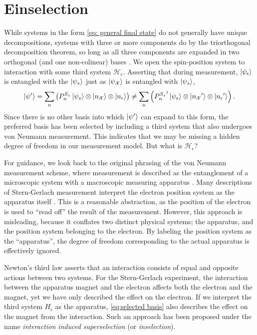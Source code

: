 \section{Einselection}

While systems in the form \autoref{eq: general final state} do not generally have unique decompositions, systems with three or more components do by the triorthogonal decomposition theorem, so long as all three components are expanded in two orthogonal (and one non-colinear) bases \cite{Elby}. We open the spin-position system to interaction with some third system $\mathcal{H}_\epsilon$. Asserting that during measurement, $\ket{\psi_\epsilon}$ is entangled with the $\ket{\psi_s}$ just as $\ket{\psi_\mathcal{X}}$ is entangled with $\ket{\psi_s}$,
\begin{align} \label{eq:selected basis}
  \ket{\psi'} = \sum_{n}\left(P^{S_z}_n\ket{\psi_s} \otimes \ket{n_\mathcal{X}} \otimes \ket{n_\epsilon} \right) \neq \sum_{n}\left({P^{S_z}_n}'\ket{\psi_s} \otimes \ket{{n_\mathcal{X}}'} \otimes \ket{{n_\epsilon}'} \right).
\end{align}
Since there is no other basis into which $\ket{\psi'}$ can expand to this form, the preferred basis has been selected by including a third system that also undergoes von Neumann measurement. This indicates that we may be missing a hidden degree of freedom in our measurement model. But what is $\mathcal{H}_\epsilon$?

For guidance, we look back to the original phrasing of the von Neumann measurement scheme, where measurement is described as the entanglement of a microscopic system with a macroscopic measuring apparatus \cite{Neumann}. Many descriptions of Stern-Gerlach measurement interpret the electron position system as the apparatus itself \cite{Venugopalan}. This is a reasonable abstraction, as the position of the electron is used to ``read off'' the result of the measurement. However, this approach is misleading, because it conflates two distinct physical systems; the apparatus, and the position system belonging to the electron. By labeling the position system as the ``apparatus'', the degree of freedom corresponding to the actual apparatus is effectively ignored.

Newton's third law asserts that an interaction consists of equal and opposite actions between two systems. For the Stern-Gerlach experiment, the interaction between the apparatus magnet and the electron affects both the electron and the magnet, yet we have only described the effect on the electron. If we interpret the third system $H_\epsilon$ as the apparatus, \autoref{eq:selected basis} also describes the effect on the magnet from the interaction. Such an approach has been proposed under the name \textit{interaction induced superselection} (or \textit{inselection})\cite{Wang}.


